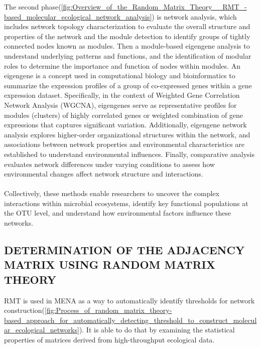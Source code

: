 The second phase(\autoref{fig:Overview_of_the_Random_Matrix_Theory__RMT_-based_molecular_ecological_network_analysis}) is network analysis, which includes network topology characterization to evaluate the overall structure and properties of the network and the module detection to identify groups of tightly connected nodes known as modules.
Then a module-based eigengene analysis to understand underlying patterns and functions, and the identification of modular roles to determine the importance and function of nodes within modules.
An eigengene is a concept used in computational biology and bioinformatics to summarize the expression profiles of a group of co-expressed genes within a gene expression dataset.
Specifically, in the context of Weighted Gene Correlation Network Analysis (WGCNA), eigengenes serve as representative profiles for modules (clusters) of highly correlated genes or weighted combination of gene expressions that captures significant variation.
Additionally, eigengene network analysis explores higher-order organizational structures within the network, and associations between network properties and environmental characteristics are established to understand environmental influences.
Finally, comparative analysis evaluates network differences under varying conditions to assess how environmental changes affect network structure and interactions.
\\\\
Collectively, these methods enable researchers to uncover the complex interactions within microbial ecosystems, identify key functional populations at the OTU level, and understand how environmental factors influence these networks.

\newpage
\subsection{DETERMINATION OF THE ADJACENCY MATRIX USING \mbox{RANDOM} MATRIX THEORY}\label{subsec:determination-of-the-adjacency-matrix-using-random-matrix-theory}

RMT is used in MENA as a way to automatically identify thresholds for network construction(\autoref{fig:Process_of_random_matrix_theory-based_approach_for_automatically_detecting_threshold_to_construct_molecular_ecological_networks}).
It is able to do that by examining the statistical properties of matrices derived from high-throughput ecological data.

